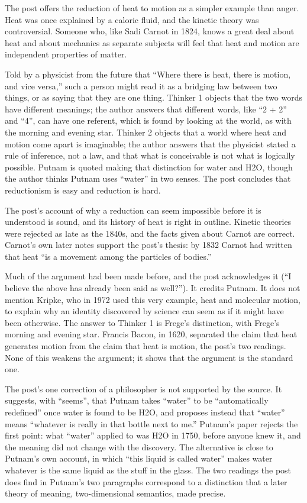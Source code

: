 \begin{afterword}
\summaryhead

The post offers the reduction of heat to motion as a simpler example than anger. Heat was once explained by a caloric fluid, and the kinetic theory was controversial. Someone who, like Sadi Carnot in 1824, knows a great deal about heat and about mechanics as separate subjects will feel that heat and motion are independent properties of matter.

Told by a physicist from the future that ``Where there is heat, there is motion, and vice versa,'' such a person might read it as a bridging law between two things, or as saying that they are one thing. Thinker 1 objects that the two words have different meanings; the author answers that different words, like ``2 + 2'' and ``4'', can have one referent, which is found by looking at the world, as with the morning and evening star. Thinker 2 objects that a world where heat and motion come apart is imaginable; the author answers that the physicist stated a rule of inference, not a law, and that what is conceivable is not what is logically possible. Putnam is quoted making that distinction for water and H2O, though the author thinks Putnam uses ``water'' in two senses. The post concludes that reductionism is easy and reduction is hard.

\responsehead

The post's account of why a reduction can seem impossible before it is understood is sound, and its history of heat is right in outline. Kinetic theories were rejected as late as the 1840s, and the facts given about Carnot are correct. Carnot's own later notes support the post's thesis: by 1832 Carnot had written that heat ``is a movement among the particles of bodies.''

Much of the argument had been made before, and the post acknowledges it (``I believe the above has already been said as well?''). It credits Putnam. It does not mention Kripke, who in 1972 used this very example, heat and molecular motion, to explain why an identity discovered by science can seem as if it might have been otherwise. The answer to Thinker 1 is Frege's distinction, with Frege's morning and evening star. Francis Bacon, in 1620, separated the claim that heat generates motion from the claim that heat is motion, the post's two readings. None of this weakens the argument; it shows that the argument is the standard one.

The post's one correction of a philosopher is not supported by the source. It suggests, with ``seems'', that Putnam takes ``water'' to be ``automatically redefined'' once water is found to be H2O, and proposes instead that ``water'' means ``whatever is really in that bottle next to me.'' Putnam's paper rejects the first point: what ``water'' applied to was H2O in 1750, before anyone knew it, and the meaning did not change with the discovery. The alternative is close to Putnam's own account, in which ``this liquid is called water'' makes water whatever is the same liquid as the stuff in the glass. The two readings the post does find in Putnam's two paragraphs correspond to a distinction that a later theory of meaning, two-dimensional semantics, made precise.


\end{afterword}
